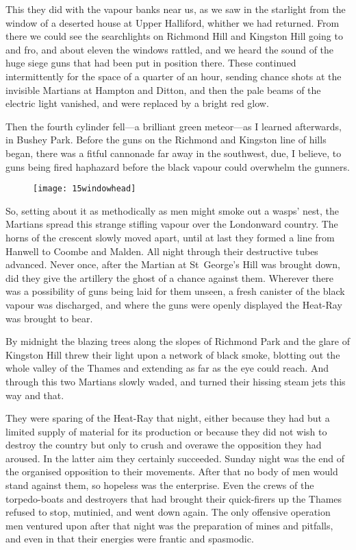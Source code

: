 This they did with the vapour banks near us, as we saw in the starlight from the window of a deserted house at Upper Halliford, whither we had returned. From there we could see the searchlights on Richmond Hill and Kingston Hill going to and fro, and about eleven the windows rattled, and we heard the sound of the huge siege guns that had been put in position there. These continued intermittently for the space of a quarter of an hour, sending chance shots at the invisible Martians at Hampton and Ditton, and then the pale beams of the electric light vanished, and were replaced by a bright red glow.

Then the fourth cylinder fell—a brilliant green meteor—as I learned afterwards, in Bushey Park.\label{cylinder4} Before the guns on the Richmond and Kingston line of hills began, there was a fitful cannonade far away in the southwest, due, I believe, to guns being fired haphazard before the black vapour could overwhelm the gunners.

\begin{figure}[tb!]
\centering
\texttt{[image: 15windowhead]}
\end{figure}

So, setting about it as methodically as men might smoke out a wasps' nest, the Martians spread this strange stifling vapour over the Londonward country. The horns of the crescent slowly moved apart, until at last they formed a line from Hanwell to Coombe and Malden. All night through their destructive tubes advanced. Never once, after the Martian at St~George's Hill was brought down, did they give the artillery the ghost of a chance against them. Wherever there was a possibility of guns being laid for them unseen, a fresh canister of the black vapour was discharged, and where the guns were openly displayed the Heat-Ray was brought to bear.

By midnight the blazing trees along the slopes of Richmond Park and the glare of Kingston Hill threw their light upon a network of black smoke, blotting out the whole valley of the Thames and extending as far as the eye could reach. And through this two Martians slowly waded, and turned their hissing steam jets this way and that.

They were sparing of the Heat-Ray that night, either because they had but a limited supply of material for its production or because they did not wish to destroy the country but only to crush and overawe the opposition they had aroused. In the latter aim they certainly succeeded. Sunday night was the end of the organised opposition to their movements. After that no body of men would stand against them, so hopeless was the enterprise. Even the crews of the torpedo-boats and destroyers that had brought their quick-firers up the Thames refused to stop, mutinied, and went down again. The only offensive operation men ventured upon after that night was the preparation of mines and pitfalls, and even in that their energies were frantic and spasmodic.

